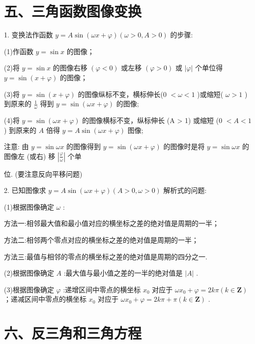 \section*{五、三角函数图像变换}

1. 变换法作函数 $y = A\sin \left( {{\omega x} + \varphi }\right) \left( {\omega  > 0,A > 0}\right)$ 的步骤:

(1)作函数 $y = \sin x$ 的图像；

(2)将 $y = \sin x$ 的图像右移 $\left( {\varphi  < 0}\right)$ 或左移 $\left( {\varphi  > 0}\right)$ 或 $\left| \varphi \right|$ 个单位得 $y = \sin \left( {x + \varphi }\right)$ 的图像；

(3)将 $y = \sin \left( {x + \varphi }\right)$ 的图像纵标不变，横标伸长(0 $< \omega  < 1$ )或缩短( $\omega  > 1$ )到原来的 $\frac{1}{\omega }$ 得到 $y = \sin \left( {{\omega x} + \varphi }\right)$ 的图像;

(4)将 $y = \sin \left( {{\omega x} + \varphi }\right)$ 的图像横标不变，纵标伸长 (A > 1) 或缩短 (0 $< A < 1$ ) 到原来的 $A$ 倍得 $y =  A\sin \left( {{\omega x} + \varphi }\right)$ 图像;

注意: 由 $y = \sin {\omega x}$ 的图像得到 $y = \sin \left( {{\omega x} + \varphi }\right)$ 的图像时是将 $y = \sin {\omega x}$ 的图像左 (或右) 移 $\left| \frac{\varphi }{\omega }\right|$ 个单

位. (要注意反向平移问题)

2. 已知图像求 $y = A\sin \left( {{\omega x} + \varphi }\right) \left( {A > 0,\omega  > 0}\right)$ 解析式的问题:

(1)根据图像确定 $\omega$ :

方法一:相邻最大值和最小值对应的横坐标之差的绝对值是周期的一半；

方法二:相邻两个零点对应的横坐标之差的绝对值是周期的一半；

方法三:最值与相邻的零点的横坐标之差的绝对值是周期的四分之一.

(2)根据图像确定 $A$ :最大值与最小值之差的一半的绝对值是 $\left| A\right|$ .

(3)根据图像确定 $\varphi$ :递增区间中零点的横坐标 ${x}_{0}$ 对应于 $\omega {x}_{0} + \varphi  = {2k\pi }\left( {k \in  \mathbf{Z}}\right)$ ；递减区间中零点的横坐标 ${x}_{0}$ 对应于 $\omega {x}_{0} + \varphi  = {2k\pi } + \pi \left( {k \in  \mathbf{Z}}\right)$ .

\section*{六、反三角和三角方程}

